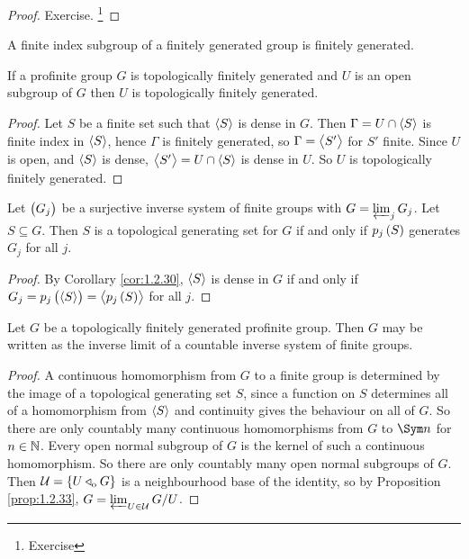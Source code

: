 \begin{proof}
Exercise. \footnote{Exercise}
\end{proof}

\begin{lemma}
A finite index subgroup of a finitely generated group is finitely generated.
\end{lemma}

\begin{proposition}
If a profinite group $ G $ is topologically finitely generated and $ U $ is an open subgroup of $ G $ then $ U $ is topologically finitely generated.
\end{proposition}

\begin{proof}
Let $ S $ be a finite set such that $ \left\langle S \right\rangle $ is dense in $ G $. Then $ \Gamma = U \cap \left\langle S \right\rangle $ is finite index in $ \left\langle S \right\rangle $, hence $ \Gamma $ is finitely generated, so $ \Gamma = \left\langle S' \right\rangle $ for $ S' $ finite. Since $ U $ is open, and $ \left\langle S \right\rangle $ is dense, $ \left\langle S' \right\rangle = U \cap \left\langle S \right\rangle $ is dense in $ U $. So $ U $ is topologically finitely generated.
\end{proof}

\begin{proposition}
Let $ \br{G_j} $ be a surjective inverse system of finite groups with $ G = \varprojlim_j G_j $. Let $ S \subseteq G $. Then $ S $ is a topological generating set for $ G $ if and only if $ p_j\br{S} $ generates $ G_j $ for all $ j $.
\end{proposition}

\begin{proof}
By Corollary \ref{cor:1.2.30}, $ \left\langle S \right\rangle $ is dense in $ G $ if and only if $ G_j = p_j\br{\abr{S}} = \abr{p_j\br{S}} $ for all $ j $.
\end{proof}

\begin{lemma}
Let $ G $ be a topologically finitely generated profinite group. Then $ G $ may be written as the inverse limit of a countable inverse system of finite groups.
\end{lemma}

\begin{proof}
A continuous homomorphism from $ G $ to a finite group is determined by the image of a topological generating set $ S $, since a function on $ S $ determines all of a homomorphism from $ \left\langle S \right\rangle $ and continuity gives the behaviour on all of $ G $. So there are only countably many continuous homomorphisms from $ G $ to $ \Sym n $ for $ n \in \mathbb{N} $. Every open normal subgroup of $ G $ is the kernel of such a continuous homomorphism. So there are only countably many open normal subgroups of $ G $. Then $ \UUU = \cbr{U \triangleleft_\o G} $ is a neighbourhood base of the identity, so by Proposition \ref{prop:1.2.33}, $ G = \varprojlim_{U \in \mathcal{U}} G / U $.
\end{proof}

